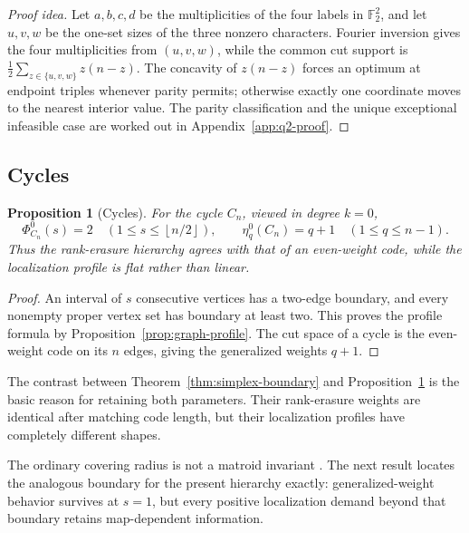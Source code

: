 \documentclass[11pt,letterpaper]{article}
\theoremstyle{plain}
\newtheorem{proposition}[theorem]{Proposition}
\theoremstyle{definition}
\newcommand{\F}{\mathbb{F}_2}
\newcommand{\1}{\mathbf{1}}
\newcommand{\floor}[1]{\left\lfloor#1\right\rfloor}
\begin{document}
\begin{proof}[Proof idea]
Let $a,b,c,d$ be the multiplicities of the four labels in $\F^2$, and let $u,v,w$ be
the one-set sizes of the three nonzero characters.  Fourier inversion gives the four
multiplicities from $(u,v,w)$, while the common cut support is
$\tfrac12\sum_{z\in\{u,v,w\}}z(n-z)$.  The concavity of $z(n-z)$ forces an optimum at
endpoint triples whenever parity permits; otherwise exactly one coordinate moves to the
nearest interior value.  The parity classification and the unique exceptional
infeasible case are worked out in Appendix~\ref{app:q2-proof}.
\end{proof}

\subsection{Cycles}

\begin{proposition}[Cycles]\label{prop:cycles}
For the cycle $C_n$, viewed in degree $k=0$,
\[
 \Phi_{C_n}^0(s)=2
 \quad (1\le s\le\floor{n/2}),
 \qquad
 \eta_q^0(C_n)=q+1
 \quad (1\le q\le n-1).
\]
Thus the rank-erasure hierarchy agrees with that of an even-weight code, while the
localization profile is flat rather than linear.
\end{proposition}

\begin{proof}
An interval of $s$ consecutive vertices has a two-edge boundary, and every nonempty
proper vertex set has boundary at least two.  This proves the profile formula by
Proposition~\ref{prop:graph-profile}.  The cut space of a cycle is the even-weight code
on its $n$ edges, giving the generalized weights $q+1$.
\end{proof}

The contrast between Theorem~\ref{thm:simplex-boundary} and
Proposition~\ref{prop:cycles} is the basic reason for retaining both parameters.  Their
rank-erasure weights are identical after matching code length, but their localization
profiles have completely different shapes.

The ordinary covering radius is not a matroid invariant
\cite{britzrutherford2005}.  The next result locates the analogous boundary for the
present hierarchy exactly: generalized-weight behavior survives at $s=1$, but every
positive localization demand beyond that boundary retains map-dependent information.
\end{document}
